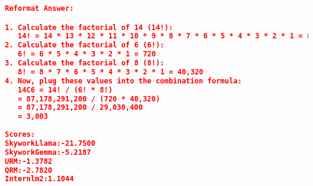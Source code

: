 \begin{lstlisting}[language=json,numbers=none]
Reformat Answer:

1. Calculate the factorial of 14 (14!):
   14! = 14 * 13 * 12 * 11 * 10 * 9 * 8 * 7 * 6 * 5 * 4 * 3 * 2 * 1 = 87,178,291,200
2. Calculate the factorial of 6 (6!):
   6! = 6 * 5 * 4 * 3 * 2 * 1 = 720
3. Calculate the factorial of 8 (8!):
   8! = 8 * 7 * 6 * 5 * 4 * 3 * 2 * 1 = 40,320
4. Now, plug these values into the combination formula:
   14C6 = 14! / (6! * 8!)
   = 87,178,291,200 / (720 * 40,320)
   = 87,178,291,200 / 29,030,400
   = 3,003
   
Scores:
SkyworkLlama:-21.7500
SkyworkGemma:-5.2187
URM:-1.3782
QRM:-2.7820
Internlm2:1.1044
\end{lstlisting}